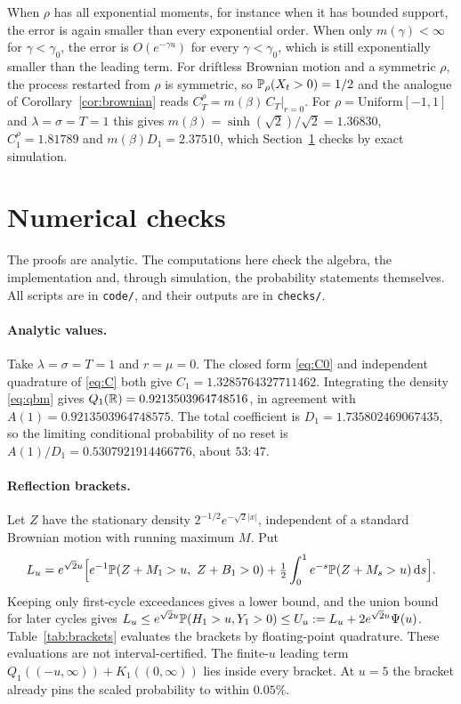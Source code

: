 \documentclass[11pt,a4paper]{article}
\begin{document}
When $\rho$ has all exponential moments, for instance when it has bounded support, the error is again smaller than every exponential order. When only $m(\gamma)<\infty$ for $\gamma<\gamma_0$, the error is $O(e^{-\gamma u})$ for every $\gamma<\gamma_0$, which is still exponentially smaller than the leading term. For driftless Brownian motion and a symmetric $\rho$, the process restarted from $\rho$ is symmetric, so $\mathbb P_\rho(X_t>0)=1/2$ and the analogue of Corollary~\ref{cor:brownian} reads $C^\rho_T=m(\beta)\,C_T|_{r=0}$. For $\rho=\mathrm{Uniform}[-1,1]$ and $\lambda=\sigma=T=1$ this gives $m(\beta)=\sinh(\sqrt2)/\sqrt2=1.36830$, $C^\rho_1=1.81789$ and $m(\beta)D_1=2.37510$, which Section~\ref{sec:numerics} checks by exact simulation.

\section{Numerical checks}\label{sec:numerics}

The proofs are analytic. The computations here check the algebra, the implementation and, through simulation, the probability statements themselves. All scripts are in \texttt{code/}, and their outputs are in \texttt{checks/}.

\paragraph{Analytic values.} Take $\lambda=\sigma=T=1$ and $r=\mu=0$. The closed form \eqref{eq:C0} and independent quadrature of \eqref{eq:C} both give $C_1=1.3285764327711462$. Integrating the density \eqref{eq:qbm} gives $Q_1(\mathbb R)=0.9213503964748516$, in agreement with $A(1)=0.9213503964748575$. The total coefficient is $D_1=1.735802469067435$, so the limiting conditional probability of no reset is $A(1)/D_1=0.5307921914466776$, about $53:47$.

\paragraph{Reflection brackets.} Let $Z$ have the stationary density $2^{-1/2}e^{-\sqrt2|x|}$, independent of a standard Brownian motion with running maximum $M$. Put
\[
 L_u=e^{\sqrt2u}\Big[e^{-1}\PP(Z+M_1>u,\ Z+B_1>0)+\tfrac12\int_0^1e^{-s}\PP(Z+M_s>u)\dd s\Big].
\]
Keeping only first-cycle exceedances gives a lower bound, and the union bound for later cycles gives $L_u\le e^{\sqrt2u}\mathbb P(H_1>u,Y_1>0)\le U_u:=L_u+2e^{\sqrt2u}\Psi(u)$. Table~\ref{tab:brackets} evaluates the brackets by floating-point quadrature. These evaluations are not interval-certified. The finite-$u$ leading term $Q_1((-u,\infty))+K_1((0,\infty))$ lies inside every bracket. At $u=5$ the bracket already pins the scaled probability to within $0.05\%$.
\end{document}
